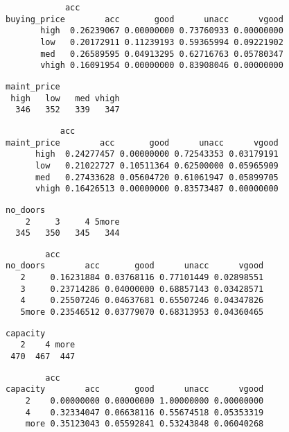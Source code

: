 \documentclass[11pt]{article}
\begin{document}
    
    
    \begin{verbatim}
            acc
buying_price        acc       good      unacc      vgood
       high  0.26239067 0.00000000 0.73760933 0.00000000
       low   0.20172911 0.11239193 0.59365994 0.09221902
       med   0.26589595 0.04913295 0.62716763 0.05780347
       vhigh 0.16091954 0.00000000 0.83908046 0.00000000
    \end{verbatim}

    
    
    \begin{verbatim}
maint_price
 high   low   med vhigh 
  346   352   339   347 
    \end{verbatim}

    
    
    \begin{verbatim}
           acc
maint_price        acc       good      unacc      vgood
      high  0.24277457 0.00000000 0.72543353 0.03179191
      low   0.21022727 0.10511364 0.62500000 0.05965909
      med   0.27433628 0.05604720 0.61061947 0.05899705
      vhigh 0.16426513 0.00000000 0.83573487 0.00000000
    \end{verbatim}

    
    
    \begin{verbatim}
no_doors
    2     3     4 5more 
  345   350   345   344 
    \end{verbatim}

    
    
    \begin{verbatim}
        acc
no_doors        acc       good      unacc      vgood
   2     0.16231884 0.03768116 0.77101449 0.02898551
   3     0.23714286 0.04000000 0.68857143 0.03428571
   4     0.25507246 0.04637681 0.65507246 0.04347826
   5more 0.23546512 0.03779070 0.68313953 0.04360465
    \end{verbatim}

    
    
    \begin{verbatim}
capacity
   2    4 more 
 470  467  447 
    \end{verbatim}

    
    
    \begin{verbatim}
        acc
capacity        acc       good      unacc      vgood
    2    0.00000000 0.00000000 1.00000000 0.00000000
    4    0.32334047 0.06638116 0.55674518 0.05353319
    more 0.35123043 0.05592841 0.53243848 0.06040268
    \end{verbatim}
\end{document}
